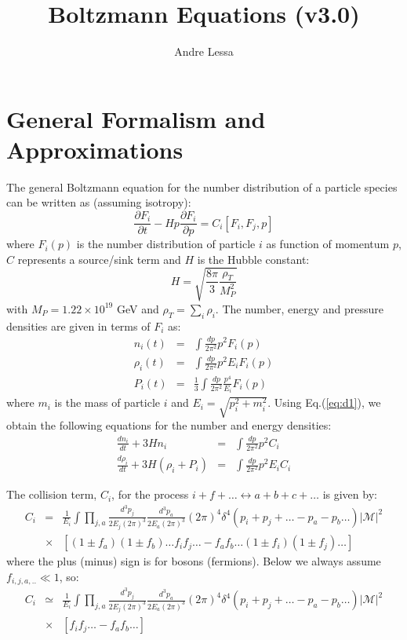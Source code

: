 \documentclass[preprint,notoc]{JHEP3}
\title{Boltzmann Equations (v3.0)}
\author{Andre Lessa}
\newcommand\drv[2]{\frac{\partial #1}{\partial #2}}
\newcommand\Drv[2]{\frac{d #1}{d #2}}
\begin{document}
\section{General Formalism and Approximations}

The general Boltzmann equation for the number distribution of a particle species can be written as\cite{turner} (assuming isotropy):
\begin{equation}
\drv{F_{i}}{t} -H p \drv{F_{i}}{p} = C_{i}[F_{i},F_{j},p] \label{eq:d1}
\end{equation}
where $F_{i}(p)$ is the number distribution of particle $i$ as function of momentum $p$, $C$ represents a source/sink term and $H$ is the Hubble constant:
\begin{equation}
H = \sqrt{\frac{8 \pi}{3} \frac{\rho_T}{M_P^2}} \label{H} 
\end{equation} 
with $M_{P} = 1.22\times 10^{19}$ GeV and $\rho_T = \sum_{i} \rho_i$. The number, energy and pressure densities are given in terms
of $F_{i}$ as:
\begin{eqnarray}
n_{i}(t) & = & \int \frac{dp}{2 \pi^2} p^2 F_i(p) \nonumber \\ 
\rho_{i}(t) & = & \int \frac{dp}{2 \pi^2} p^2 E_i F_i(p) \label{beqs}\\
P_{i}(t) & = & \frac{1}{3} \int \frac{dp}{2 \pi^2} \frac{p^4}{E_i} F_i(p) \nonumber
\end{eqnarray}
where $m_i$ is the mass of particle $i$ and $E_i = \sqrt{p_i^2 + m_i^2}$. Using Eq.(\ref{eq:d1}), we obtain the following equations for the number and energy densities:
\begin{eqnarray}
\Drv{n_i}{t} + 3H n_i & = & \int \frac{dp}{2 \pi^2} p^2 C_i \nonumber \\
\Drv{\rho_i}{t} + 3H (\rho_i + P_i) & = & \int \frac{dp}{2 \pi^2} p^2 E_i C_i \label{eq:meqs}
\end{eqnarray}

The collision term, $C_i$, for the process $i + f + \ldots \leftrightarrow a
+ b + c + \ldots$ is given by\cite{kawasaki0}:
\begin{eqnarray}
C_i & = & \frac{1}{E_i} \int \prod_{j,a} \frac{d^3 p_j}{2 E_j (2 \pi)^3}
\frac{d^3 p_a}{2 E_a (2 \pi)^3} (2 \pi)^4 \delta^{4}\left(p_i + p_j + \ldots - p_a - p_b
\ldots\right) |\mathcal{M}|^2 \nonumber \\
&\times& \left[(1 \pm f_a) (1 \pm
f_b)\ldots f_i f_j\ldots - f_a f_b \ldots (1 \pm f_i)(1 \pm f_j)\ldots \right]
\end{eqnarray}
where the plus (minus) sign is for bosons (fermions). Below we always assume
$f_{i,j,a,..} \ll 1$, so:
\begin{eqnarray}
C_i & \simeq & \frac{1}{E_i} \int \prod_{j,a} \frac{d^3 p_j}{2 E_j (2 \pi)^3}
\frac{d^3 p_a}{2 E_a (2 \pi)^3} (2 \pi)^4 \delta^{4}\left(p_i + p_j + \ldots - p_a - p_b
\ldots\right) |\mathcal{M}|^2 \nonumber \\
&\times& \left[f_i f_j\ldots - f_a f_b \ldots \right]
\end{eqnarray}
\end{document}
